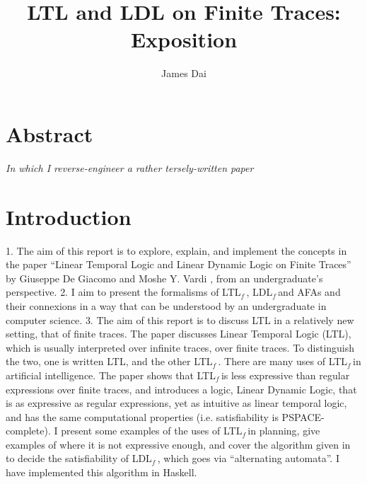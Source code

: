 \documentclass[11pt, oneside]{article}
\title{LTL and LDL on Finite Traces: Exposition} \author{James Dai}
\newcommand{\ltlf}{LTL$_f\,$}
\newcommand{\ldlf}{LDL$_f\,$}
\newcommand{\red}[1]{{\color{red} #1}}
\begin{document}
\maketitle \tableofcontents \newpage
\section{Abstract}
\begin{center}
  \red{\emph{In which I reverse-engineer a rather tersely-written paper}}
\end{center}
\section {Introduction}
\begin{comment}
I mainly follow the arguments of Vardi and de Giacomo in the paper ``Linear Temporal Logic and Linear Dynamic Logic on Finite Traces'' \cite{ldlf},
as well as parts of their other papers in the same area.
A wide range of ideas are woven into this setting. Planning, processes, Dynamic Logic, alternating automata.
I also implement a satisfiability algorithm, though this is somewhat an afterthought. Or is it?? Well.
It is a bit of a makeshift thing to be honest.
\end{comment}
\red{1. The aim of this report} is to explore, explain, and implement the concepts in the paper
``Linear Temporal Logic and Linear Dynamic Logic on Finite Traces'' by Giuseppe De Giacomo and Moshe Y. Vardi \cite{ldlf},
from an undergraduate's perspective.
\red{2. I aim to present the formalisms} of \ltlf, \ldlf and AFAs and their connexions in a way
that can be understood by an undergraduate in computer science.
\red{3. The aim of this report is} to discuss LTL in a relatively new setting, that of finite traces.
The paper discusses Linear Temporal Logic (LTL),
which is usually interpreted over infinite traces, over finite traces.
To distinguish the two, one is written LTL, and the other \ltlf.
There are many uses of \ltlf in artificial intelligence.
The paper shows that \ltlf is less expressive than regular expressions over finite traces,
and introduces a logic, Linear Dynamic Logic, that is as expressive as regular expressions,
yet as intuitive as linear temporal logic, and has the same computational properties (i.e. satisfiability is PSPACE-complete).
I present some examples of the uses of \ltlf in planning,
give examples of where it is not expressive enough,
and cover the algorithm given in \cite{ldlf} to decide the satisfiability of \ldlf,
which goes via ``alternating automata''. I have implemented this algorithm in Haskell.
\end{document}
